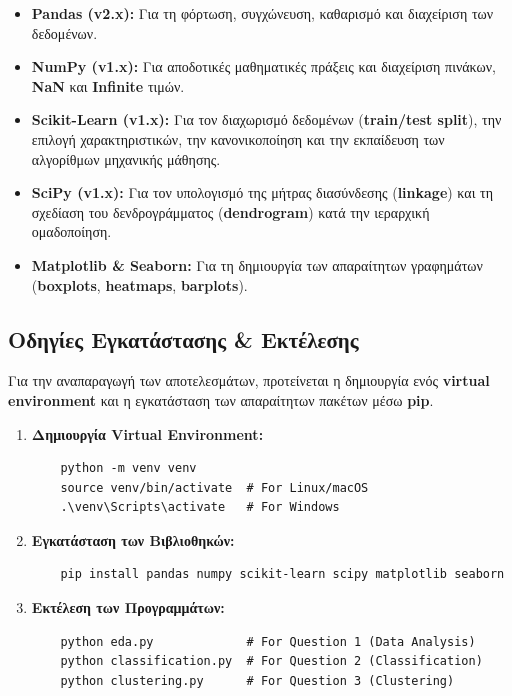 \documentclass[11pt,a4paper]{article}
\newcommand{\eng}[1]{\textlatin{#1}}
\begin{document}
\begin{itemize}
    \item \textbf{\eng{Pandas (v2.x):}} Για τη φόρτωση, συγχώνευση, καθαρισμό και διαχείριση των δεδομένων.
    \item \textbf{\eng{NumPy (v1.x):}} Για αποδοτικές μαθηματικές πράξεις και διαχείριση πινάκων, \textbf{\eng{NaN}} και \textbf{\eng{Infinite}} τιμών.
    \item \textbf{\eng{Scikit-Learn (v1.x):}} Για τον διαχωρισμό δεδομένων (\textbf{\eng{train/test split}}), την επιλογή χαρακτηριστικών, την κανονικοποίηση και την εκπαίδευση των αλγορίθμων μηχανικής μάθησης.
    \item \textbf{\eng{SciPy (v1.x):}} Για τον υπολογισμό της μήτρας διασύνδεσης (\textbf{\eng{linkage}}) και τη σχεδίαση του δενδρογράμματος (\textbf{\eng{dendrogram}}) κατά την ιεραρχική ομαδοποίηση.
    \item \textbf{\eng{Matplotlib \& Seaborn:}} Για τη δημιουργία των απαραίτητων γραφημάτων (\textbf{\eng{boxplots}}, \textbf{\eng{heatmaps}}, \textbf{\eng{barplots}}).
\end{itemize}

\subsection{Οδηγίες Εγκατάστασης \& Εκτέλεσης}
Για την αναπαραγωγή των αποτελεσμάτων, προτείνεται η δημιουργία ενός \textbf{\eng{virtual environment}} και η εγκατάσταση των απαραίτητων πακέτων μέσω \textbf{\eng{pip}}.

\begin{infobox}[Οδηγίες \eng{Setup} (\eng{Terminal})]
\begin{enumerate}
    \item \textbf{Δημιουργία \eng{Virtual Environment}:}
    \begin{otherlanguage}{english}
    \begin{verbatim}
    python -m venv venv
    source venv/bin/activate  # For Linux/macOS
    .\venv\Scripts\activate   # For Windows
    \end{verbatim}
    \end{otherlanguage}
    \item \textbf{Εγκατάσταση των Βιβλιοθηκών:}
    \begin{otherlanguage}{english}
    \begin{verbatim}
    pip install pandas numpy scikit-learn scipy matplotlib seaborn
    \end{verbatim}
    \end{otherlanguage}
    \item \textbf{Εκτέλεση των Προγραμμάτων:}
    \begin{otherlanguage}{english}
    \begin{verbatim}
    python eda.py             # For Question 1 (Data Analysis)
    python classification.py  # For Question 2 (Classification)
    python clustering.py      # For Question 3 (Clustering)
    \end{verbatim}
    \end{otherlanguage}
\end{enumerate}
\end{infobox}
\end{document}

